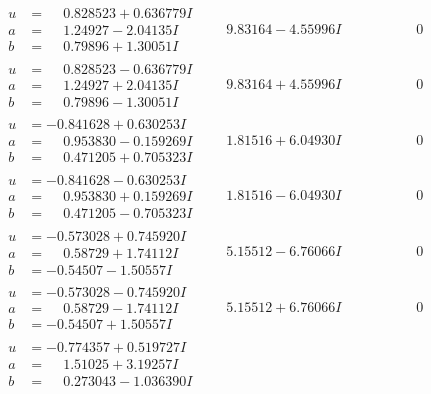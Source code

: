 \documentclass[1p]{elsarticle_modified}
\theoremstyle{definition}
\begin{document}
$$\begin{array}{c|c|c}
\begin{aligned}
u &= \phantom{-}0.828523 + 0.636779 I \\
a &= \phantom{-}1.24927 - 2.04135 I \\
b &= \phantom{-}0.79896 + 1.30051 I\end{aligned}
 & \phantom{-}9.83164 - 4.55996 I & \phantom{-0.000000 } 0 \\ \hline\begin{aligned}
u &= \phantom{-}0.828523 - 0.636779 I \\
a &= \phantom{-}1.24927 + 2.04135 I \\
b &= \phantom{-}0.79896 - 1.30051 I\end{aligned}
 & \phantom{-}9.83164 + 4.55996 I & \phantom{-0.000000 } 0 \\ \hline\begin{aligned}
u &= -0.841628 + 0.630253 I \\
a &= \phantom{-}0.953830 - 0.159269 I \\
b &= \phantom{-}0.471205 + 0.705323 I\end{aligned}
 & \phantom{-}1.81516 + 6.04930 I & \phantom{-0.000000 } 0 \\ \hline\begin{aligned}
u &= -0.841628 - 0.630253 I \\
a &= \phantom{-}0.953830 + 0.159269 I \\
b &= \phantom{-}0.471205 - 0.705323 I\end{aligned}
 & \phantom{-}1.81516 - 6.04930 I & \phantom{-0.000000 } 0 \\ \hline\begin{aligned}
u &= -0.573028 + 0.745920 I \\
a &= \phantom{-}0.58729 + 1.74112 I \\
b &= -0.54507 - 1.50557 I\end{aligned}
 & \phantom{-}5.15512 - 6.76066 I & \phantom{-0.000000 } 0 \\ \hline\begin{aligned}
u &= -0.573028 - 0.745920 I \\
a &= \phantom{-}0.58729 - 1.74112 I \\
b &= -0.54507 + 1.50557 I\end{aligned}
 & \phantom{-}5.15512 + 6.76066 I & \phantom{-0.000000 } 0 \\ \hline\begin{aligned}
u &= -0.774357 + 0.519727 I \\
a &= \phantom{-}1.51025 + 3.19257 I \\
b &= \phantom{-}0.273043 - 1.036390 I\end{aligned}

\end{array}$$
\end{document}
